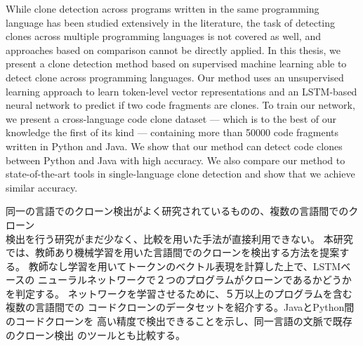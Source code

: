 \begin{eabstract}
While clone detection across programs written in the same programming language
has been studied extensively in the literature, the task of detecting clones
across multiple programming languages is not covered as well, and approaches
based on comparison cannot be directly applied.
In this thesis, we present a clone detection method based on supervised
machine learning able to detect clone across programming languages.
Our method uses an unsupervised learning approach to learn token-level vector
representations and an LSTM-based neural network to predict if two code
fragments are clones. To train our network, we present a cross-language code
clone dataset --- which is to the best of our knowledge the first of its kind
--- containing more than 50000 code fragments written in Python and Java.
We show that our method can detect code clones between Python and Java with high
accuracy. We also compare our method to state-of-the-art tools in
single-language clone detection and show that we achieve similar accuracy.
\end{eabstract}

\begin{jabstract}
同一の言語でのクローン検出がよく研究されているものの、複数の言語間でのクローン\\%
検出を行う研究がまだ少なく、比較を用いた手法が直接利用できない。%
本研究では、教師あり機械学習を用いた言語間でのクローンを検出する方法を提案する。%
教師なし学習を用いてトークンのベクトル表現を計算した上で、LSTMベースの%
ニューラルネットワークで２つのプログラムがクローンであるかどうかを判定する。%
ネットワークを学習させるために、５万以上のプログラムを含む複数の言語間での%
コードクローンのデータセットを紹介する。JavaとPython間のコードクローンを%
高い精度で検出できることを示し、同一言語の文脈で既存のクローン検出%
のツールとも比較する。
\end{jabstract}
